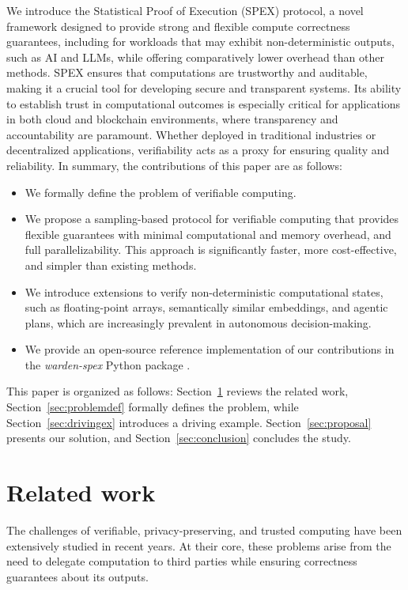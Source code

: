 \documentclass[sigconf, nonacm]{acmart}
\begin{document}
We introduce the Statistical Proof of Execution (SPEX) protocol, a novel framework designed to provide strong and flexible compute correctness guarantees, including for workloads that may exhibit non-deterministic outputs, such as AI and LLMs, while offering comparatively lower overhead than other methods. SPEX ensures that computations are trustworthy and auditable, making it a crucial tool for developing secure and transparent systems.
Its ability to establish trust in computational outcomes is especially critical for applications in both cloud and blockchain environments, where transparency and accountability are paramount. Whether deployed in traditional industries or decentralized applications, verifiability acts as a proxy for ensuring quality and reliability.
In summary, the contributions of this paper are as follows:

\begin{itemize}
  \item We formally define the problem of verifiable computing.
  \item We propose a sampling-based protocol for verifiable computing that provides flexible guarantees with minimal computational and memory overhead, and full parallelizability. This approach is significantly faster, more cost-effective, and simpler than existing methods.
  \item We introduce extensions to verify non-deterministic computational states, such as floating-point arrays, semantically similar embeddings, and agentic plans, which are increasingly prevalent in autonomous decision-making.
  \item We provide an open-source reference implementation of our contributions in the \textit{warden-spex} Python package \cite{spex202501}.
\end{itemize}

This paper is organized as follows: Section~\ref{sec:relwork} reviews the related work, Section~\ref{sec:problemdef} formally defines the problem, while  Section~\ref{sec:drivingex} introduces a driving example. Section~\ref{sec:proposal} presents our solution, and Section~\ref{sec:conclusion} concludes the study.

\section{Related work}
\label{sec:relwork}

The challenges of verifiable, privacy-preserving, and trusted computing have been extensively studied in recent years. At their core, these problems arise from the need to delegate computation to third parties while ensuring correctness guarantees about its outputs.
\end{document}
